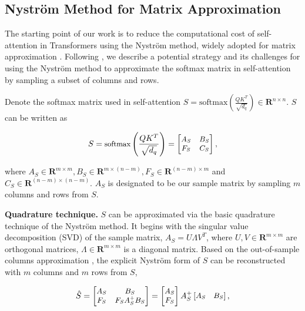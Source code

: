 \subsection{Nystr\"{o}m Method for Matrix Approximation} \label{sec:linear}

The starting point of our work is to reduce the computational cost of self-attention in Transformers using the Nystr\"{o}m method, widely adopted for matrix approximation \cite{williams2001using,drineas2005nystrom,wang2013improving}. Following \cite{wang2013improving}, we describe a potential strategy and its challenges for using the Nystr\"{o}m method to approximate the softmax matrix in self-attention by sampling a subset of columns and rows. 

Denote the softmax matrix used in self-attention $S = \text{softmax}\left( \frac{QK^T}{\sqrt{d_q}} \right) \in \textbf{R}^{n\times n}$. $S$ can be written as

\begin{equation}\label{eq:gendec}
\small
    S = \text{softmax}\left( \frac{QK^T}{\sqrt{d_q}} \right) =
    \begin{bmatrix}
    A_S & B_S \\
    F_S & C_S
    \end{bmatrix},
\end{equation}

where $A_S \in \textbf{R}^{m\times m}, B_S \in \textbf{R}^{m\times (n - m)}, F_S \in \textbf{R}^{(n - m) \times m}$ and $C_S \in \textbf{R}^{(n-m)\times (n -m)}$. $A_S$ is designated to be our sample matrix by sampling $m$ columns and rows from $S$. 

\smallskip
 \textbf{Quadrature technique.} $S$ can be approximated via the basic quadrature technique of the Nystr\"{o}m method. It begins with the singular value decomposition (SVD) of the sample matrix, $A_S = U\Lambda V^T$, where $U, V \in \textbf{R}^{m \times m}$ are orthogonal matrices, $\Lambda \in \textbf{R}^{m \times m}$ is a diagonal matrix. Based on the out-of-sample columns approximation \cite{wang2013improving}, the explicit Nystr\"{o}m form of $S$ can be reconstructed with $m$ columns and $m$ rows from $S$,

\begin{align}\label{eq:gennys}
\small
    \hat{S} = 
    \begin{bmatrix}
    A_S & B_S \\
    F_S & F_SA_S^{+}B_S
    \end{bmatrix}
    =
    \begin{bmatrix}
    A_S \\
    F_S
    \end{bmatrix}
    A_S^{+}
        \begin{bmatrix}
    A_S \quad B_S
    \end{bmatrix},
\end{align}

